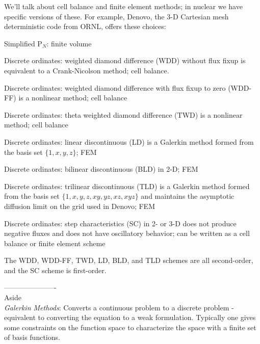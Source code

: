 \documentclass[12pt]{article}
\begin{document}
We'll talk about cell balance and finite element methods; in nuclear we have specific versions of these. For example, Denovo, the 3-D Cartesian mesh deterministic code from ORNL, offers these choices:
\begin{compactitem}
\item Simplified P$_N$: finite volume 
\item Discrete ordinates: weighted diamond difference (WDD) without flux fixup is equivalent to a Crank-Nicolson method; cell balance.
\item Discrete ordinates: weighted diamond difference with flux fixup to zero (WDD-FF)  is a nonlinear method; cell balance 
\item Discrete ordinates: theta weighted diamond difference (TWD)  is a nonlinear method; cell balance
\item Discrete ordinates: linear discontinuous (LD) is a Galerkin method formed from the basis set $\{1,x,y,z\}$; FEM 
\item Discrete ordinates: bilinear discontinuous (BLD) in 2-D; FEM
\item Discrete ordinates: trilinear discontinuous (TLD) is a Galerkin method formed from the basis set $\{1,x,y,z,xy,yz,xz,xyz\}$ and maintains the asymptotic diffusion limit on the grid used in Denovo; FEM
\item Discrete ordinates: step characteristics (SC) in 2- or 3-D does not produce negative fluxes and does not have oscillatory behavior; can be written as a cell balance or finite element scheme
\end{compactitem}
The WDD, WDD-FF, TWD, LD, BLD, and TLD schemes are all second-order, and the SC scheme is first-order.  

----------------------\\
Aside\\ 
\emph{Galerkin Methods}: Converts a continuous problem to a discrete problem - equivalent to converting the equation to a weak formulation. Typically one gives some constraints on the function space to characterize the space with a finite set of basis functions.\\
\end{document}
